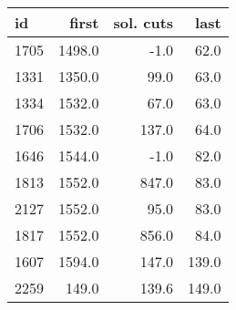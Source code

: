 \begin{tabular}{lrrr}
\toprule
   id &  first &  sol. cuts &  last \\
\midrule
 1705 & 1498.0 &       -1.0 &  62.0 \\
 1331 & 1350.0 &       99.0 &  63.0 \\
 1334 & 1532.0 &       67.0 &  63.0 \\
 1706 & 1532.0 &      137.0 &  64.0 \\
 1646 & 1544.0 &       -1.0 &  82.0 \\
 1813 & 1552.0 &      847.0 &  83.0 \\
 2127 & 1552.0 &       95.0 &  83.0 \\
 1817 & 1552.0 &      856.0 &  84.0 \\
 1607 & 1594.0 &      147.0 & 139.0 \\
 2259 &  149.0 &      139.6 & 149.0 \\
\bottomrule
\end{tabular}
